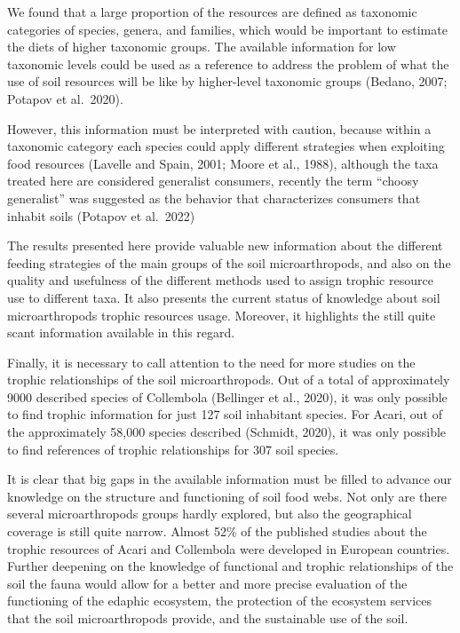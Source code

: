 \documentclass[10pt,oneside]{article}
\begin{document}
We found that a large proportion of the resources are defined as
taxonomic categories of species, genera, and families, which would be
important to estimate the diets of higher taxonomic groups. The
available information for low taxonomic levels could be used as a
reference to address the problem of what the use of soil resources will
be like by higher-level taxonomic groups (Bedano, 2007; Potapov et
al.~2020).

However, this information must be interpreted with caution, because
within a taxonomic category each species could apply different
strategies when exploiting food resources (Lavelle and Spain, 2001;
Moore et al., 1988), although the taxa treated here are considered
generalist consumers, recently the term ``choosy generalist'' was
suggested as the behavior that characterizes consumers that inhabit
soils (Potapov et al.~2022)

The results presented here provide valuable new information about the
different feeding strategies of the main groups of the soil
microarthropods, and also on the quality and usefulness of the different
methods used to assign trophic resource use to different taxa. It also
presents the current status of knowledge about soil microarthropods
trophic resources usage. Moreover, it highlights the still quite scant
information available in this regard.

Finally, it is necessary to call attention to the need for more studies
on the trophic relationships of the soil microarthropods. Out of a total
of approximately 9000 described species of Collembola (Bellinger et al.,
2020), it was only possible to find trophic information for just 127
soil inhabitant species. For Acari, out of the approximately 58,000
species described (Schmidt, 2020), it was only possible to find
references of trophic relationships for 307 soil species.

It is clear that big gaps in the available information must be filled to
advance our knowledge on the structure and functioning of soil food
webs. Not only are there several microarthropods groups hardly explored,
but also the geographical coverage is still quite narrow. Almost 52\% of
the published studies about the trophic resources of Acari and
Collembola were developed in European countries. Further deepening on
the knowledge of functional and trophic relationships of the soil the
fauna would allow for a better and more precise evaluation of the
functioning of the edaphic ecosystem, the protection of the ecosystem
services that the soil microarthropods provide, and the sustainable use
of the soil.
\end{document}
